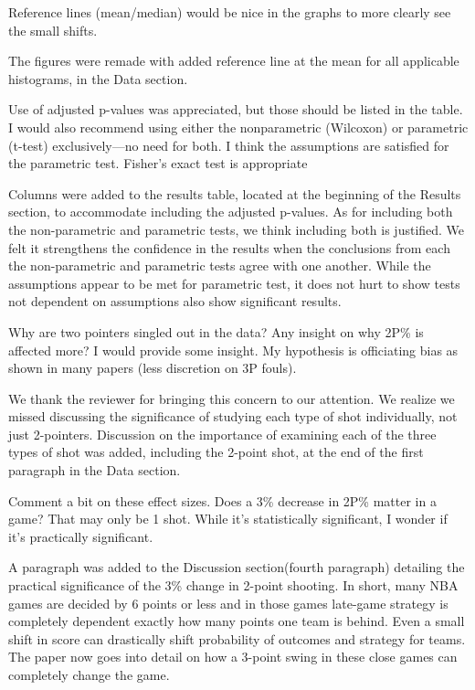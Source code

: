 \documentclass[12pt]{article}
\newenvironment{comment}%
{\begin{quoting}\noindent\small\it\ignorespaces%
  }{\end{quoting}}
\begin{document}
\begin{comment}
  Reference lines (mean/median) would be nice in the graphs to more clearly
  see the small shifts.
\end{comment}

The figures were remade with added reference line at the mean for all 
applicable histograms, in the Data section.
 
\begin{comment}
Use of adjusted p-values was appreciated, but those should be listed in 
the table.  I would also recommend using either the nonparametric (Wilcoxon)
or parametric (t-test) exclusively—no need for both.  I think the 
assumptions are satisfied for the parametric test.  Fisher’s exact test 
is appropriate
\end{comment}

 Columns were added to the results table, located at the beginning of the Results section,
 to accommodate including the adjusted p-values. As for including both the non-parametric
 and parametric tests, we think including both is justified. We felt it strengthens the 
 confidence in the results when the conclusions from each the non-parametric and parametric 
 tests agree with one another. While the assumptions appear to be met for parametric
 test, it does not hurt to show tests not dependent on assumptions also show
 significant results.
 
\begin{comment}
 Why are two pointers singled out in the data? Any insight on why 2P\% is 
 affected more? I would provide some insight. My hypothesis is officiating 
 bias as shown in many papers (less discretion on 3P fouls). 
\end{comment}

 We thank the reviewer for bringing this concern to our attention. We realize
 we missed discussing the significance of studying each type of shot individually,
 not just 2-pointers. Discussion on the importance of examining each of the three
 types of shot was added, including the 2-point shot, at the end of the first 
 paragraph in the Data section.

\begin{comment}
Comment a bit on these effect sizes. Does a 3\% decrease in 2P\% matter in a game?
That may only be 1 shot. While it's statistically significant, I wonder 
if it's practically significant.
\end{comment}

 A paragraph was added to the Discussion section(fourth paragraph) detailing the practical 
 significance of the 3\% change in 2-point shooting. In short, many NBA games 
 are decided by 6 points or less and in those games late-game strategy is 
 completely dependent exactly how many points one team is behind. Even a small
 shift in score can drastically shift probability of outcomes and strategy 
 for teams. The paper now goes into detail on how a 3-point swing in these 
 close games can completely change the game.
\end{document}
